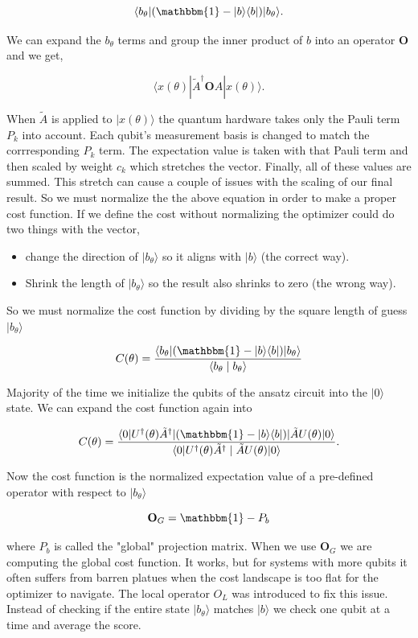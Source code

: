\documentclass[12pt, oneside]{book}
\begin{document}
$$
\langle b_{\theta}|(\mathbbm{1}-|b\rangle\langle b|)|b_{\theta}\rangle.
$$

We can expand the $b_{\theta}$ terms and group the inner product of $b$ into an operator $\mathbf{O}$ and we get,  

$$
\langle x(\theta) | \tilde{A}^{\dagger} \mathbf{O} A | x(\theta) \rangle. 
$$ 

When $\tilde{A}$ is applied to $|x(\theta)\rangle$ the quantum hardware takes only the Pauli term $P_k$ into account. Each qubit's
measurement basis is changed to match the corrresponding $P_k$ term. The expectation value is taken with that Pauli term and then 
scaled by weight $c_k$ which stretches the vector. Finally, all of these values are summed. This stretch can cause a couple of
issues with the scaling of our final result. So we must normalize the the above equation in order to make a proper 
cost function. If we define the cost without normalizing the optimizer could do two things with the vector,

\begin{itemize}
  \item[1.] change the direction of $|b_{\theta}\rangle$ so it aligns with $|b\rangle$ (the correct way).
  \item[2.] Shrink the length of $|b_{\theta}\rangle$ so the result also shrinks to zero (the wrong way).
\end{itemize}

So we must normalize the cost function by dividing by the square length of guess $|b_{\theta}\rangle$

$$
C(\theta)=\frac{\langle b_{\theta}|(\mathbbm{1}-|b\rangle\langle b|)| b_{\theta}\rangle}
{\langle b_{\theta} \mid b_{\theta}\rangle}
$$

Majority of the time we initialize the qubits of the ansatz circuit into the $|0\rangle$ state. We can expand the cost function
again into

$$
C(\theta)=\frac{\langle 0|U^{\dagger}(\theta) \tilde{A}^{\dagger}|(\mathbbm{1}-|b\rangle\langle b|)| \tilde{A} U(\theta) |0\rangle}
{\langle 0| U^{\dagger}(\theta) \tilde{A}^{\dagger} \mid \tilde{A} U(\theta) |0 \rangle}.
$$

Now the cost function is the normalized expectation value of a pre-defined operator with respect to $|b_{\theta}\rangle$

$$
\mathbf{O}_G = \mathbbm{1} - P_b
$$

where $P_b$ is called the "global" projection matrix. When we use $\mathbf{O}_G$ we are computing the global cost function. 
It works, but for systems with more qubits it often suffers from barren platues when the cost landscape 
is too flat for the optimizer to navigate. The local operator $O_L$ was introduced to fix this issue. 
Instead of checking if the entire state $|b_{\theta}\rangle$ matches $|b\rangle$ we check one qubit at a time 
and average the score.
\end{document}
